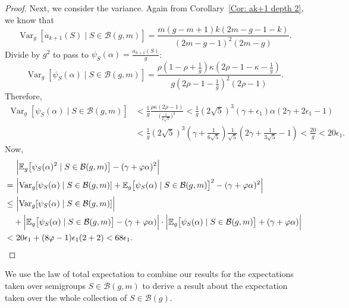 \documentclass[12pt]{amsart}
\def\B{{\mathcal B}}
\def\E{{\mathbb E}}
\renewcommand{\phi}{\varphi}
\def\Var{{\operatorname{Var}}}
\begin{document}
\begin{proof}
Next, we consider the variance.
Again from Corollary~\ref{Cor: ak+1 depth 2}, we know that
\[\Var_g[a_{k+1}(S)\mid S\in \B(g,m)]
=\frac{m(g-m+1)k(2m-g-1-k)}{(2m-g-1)^2(2m-g)}.\]
Divide by $g^2$ to pass to $\psi_S(\alpha)= \frac{a_{k+1}(S)}{g}$:
\[
\Var_g[\psi_S(\alpha)\mid S\in \B(g,m)]
=\frac{\rho(1-\rho+\tfrac1g) \kappa (2\rho-1-\kappa-\tfrac1g)}
{g (2\rho-1-\tfrac1g)^2(2\rho-1)}.
\]
Therefore,
\begin{align*}
\Var_g[\psi_S(\alpha)\mid S\in \B(g,m)]
&<\frac{1}{g} \frac{\rho \kappa (2\rho-1)}
{ \big(\frac{1}{2\sqrt{5}}\big)^3}
<\frac{1}{g} \left(2\sqrt{5}\right)^3 (\gamma+\epsilon_1) \alpha (2\gamma+2\epsilon_1-1)\\
&<\frac{1}{g} \left(2\sqrt{5}\right)^3 \left(\gamma+\frac{1}{6\sqrt{5}}\right) \frac{1}{\sqrt{5}} \left(2\gamma+\frac{1}{3\sqrt{5}}-1\right)
<\frac{20}{g} < 20\epsilon_1.
\end{align*}
Now,
\begin{align*}
& \ \Bigl|\E_g \big[\psi_S(\alpha)^2\mid S\in\mathcal B(g,m)\big]-(\gamma+\phi\alpha)^2\Bigr|\\
=&\   \Bigl| \Var_g[\psi_S(\alpha)\mid S\in \B(g,m)] +\E_g \big[\psi_S(\alpha)\mid S\in\mathcal B(g,m)\big]^2 -(\gamma+\phi\alpha)^2\Bigr|\\
\leq &\ \Bigl| \Var_g[\psi_S(\alpha)\mid S\in \B(g,m)] \Bigr|\\
& +\Bigl|\E_g \big[\psi_S(\alpha)\mid S\in\mathcal B(g,m)\big] -(\gamma+\phi\alpha)\Bigr|
\cdot \Bigl|\E_g \big[\psi_S(\alpha)\mid S\in\mathcal B(g,m)\big] +(\gamma+\phi\alpha)\Bigr|\\
<& \  20\epsilon_1 + (8\phi-1)\epsilon_1 (2+2)
<68\epsilon_1.\qedhere
\end{align*}
\end{proof}

We use the law of total expectation to combine our results for the expectations taken over semigroups $S\in \B(g,m)$ to derive a result about the expectation taken over the whole collection of $S \in \B(g)$.
\end{document}
